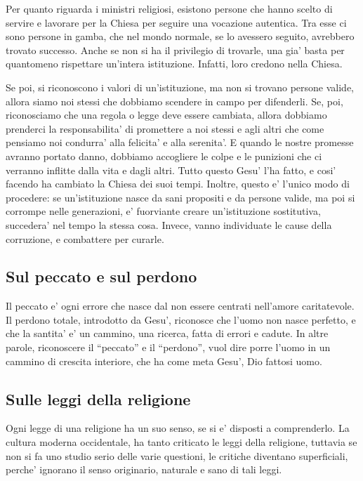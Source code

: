 Per quanto riguarda i ministri religiosi, esistono persone che hanno scelto di servire e lavorare per la Chiesa per seguire una vocazione autentica. Tra esse ci sono persone in gamba, che nel mondo normale, se lo avessero seguito, avrebbero trovato successo.
Anche se non si ha il privilegio di trovarle, una gia' basta per quantomeno rispettare un'intera istituzione. Infatti, loro credono nella Chiesa.

Se poi, si riconoscono i valori di un'istituzione, ma non si trovano persone valide, allora siamo noi stessi che dobbiamo scendere in campo per difenderli. Se, poi, riconosciamo che una regola o legge deve essere cambiata, allora dobbiamo prenderci la responsabilita' di promettere a noi stessi e agli altri che come pensiamo noi condurra' alla felicita' e alla serenita'. E quando le nostre promesse avranno portato danno, dobbiamo accogliere le colpe e le punizioni che ci verranno inflitte dalla vita e dagli altri. Tutto questo Gesu' l'ha fatto, e cosi' facendo ha cambiato la Chiesa dei suoi tempi. 
Inoltre, questo e' l'unico modo di procedere: se un'istituzione nasce da sani propositi e da persone valide, ma poi si corrompe nelle generazioni, e' fuorviante creare un'istituzione sostitutiva, succedera' nel tempo la stessa cosa. Invece, vanno individuate le cause della corruzione, e combattere per curarle.

\subsection{Sul peccato e sul perdono}

Il peccato e' ogni errore che nasce dal non essere centrati nell'amore caritatevole. Il perdono totale, introdotto da Gesu', riconosce che l'uomo non nasce perfetto, e che la santita' e' un cammino, una ricerca, fatta di errori e cadute. In altre parole, riconoscere il ``peccato'' e il ``perdono'', vuol dire porre l'uomo in un cammino di crescita interiore, che ha come meta Gesu', Dio fattosi uomo.

\subsection{Sulle leggi della religione}

Ogni legge di una religione ha un suo senso, se si e' disposti a comprenderlo. La cultura moderna occidentale, ha tanto criticato le leggi della religione, tuttavia se non si fa uno studio serio delle varie questioni, le critiche diventano superficiali, perche' ignorano il senso originario, naturale e sano di tali leggi.

